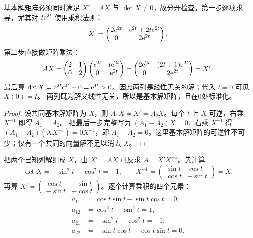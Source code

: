 基本解矩阵必须同时满足 $X'=AX$ 与 $\det X\ne0$，故分开检查。第一步逐项求导，尤其对 $t\mathrm e^{2t}$ 使用乘积法则：
\[
X'=\begin{pmatrix}2\mathrm e^{2t}&\mathrm e^{2t}+2t\mathrm e^{2t}\\0&2\mathrm e^{2t}\end{pmatrix}.
\]
第二步直接做矩阵乘法：
\[
AX=\begin{pmatrix}2&1\\0&2\end{pmatrix}
\begin{pmatrix}\mathrm e^{2t}&t\mathrm e^{2t}\\0&\mathrm e^{2t}\end{pmatrix}
=\begin{pmatrix}2\mathrm e^{2t}&(2t+1)\mathrm e^{2t}\\0&2\mathrm e^{2t}\end{pmatrix}=X'.
\]
最后算 $\det X=\mathrm e^{2t}\mathrm e^{2t}-0=\mathrm e^{4t}>0$。因此两列是线性无关的解；代入 $t=0$ 可见 $X(0)=I$。
两列既为解又线性无关，所以是基本解矩阵，且在0处标准化。
\begin{proof}
设共同基本解矩阵为 $X$，则 $A_1X=X'=A_2X$。每个 $t$ 上 $X$ 可逆，右乘 $X^{-1}$ 即得 $A_1=A_2$。
把最后一步完整写为 $(A_1-A_2)X=0$，右乘 $X^{-1}$ 得 $(A_1-A_2)(XX^{-1})=0X^{-1}$，即 $A_1-A_2=0$。这里基本解矩阵的可逆性不可少；仅有一个共同的向量解不足以消去 $X$。
\end{proof}
把两个已知列解组成 $X$，由 $X'=AX$ 可反求 $A=X'X^{-1}$。先计算
\[
\det X=-\sin^2t-\cos^2t=-1,
\qquad X^{-1}=\begin{pmatrix}\sin t&\cos t\\\cos t&-\sin t\end{pmatrix}=X.
\]
再算 $X'=\begin{pmatrix}\cos t&-\sin t\\-\sin t&-\cos t\end{pmatrix}$。逐个计算乘积的四个元素：
\[
\begin{aligned}
a_{11}&=\cos t\sin t-\sin t\cos t=0,\\
a_{12}&=\cos^2t+\sin^2t=1,\\
a_{21}&=-\sin^2t-\cos^2t=-1,\\
a_{22}&=-\sin t\cos t+\cos t\sin t=0.
\end{aligned}
\]
